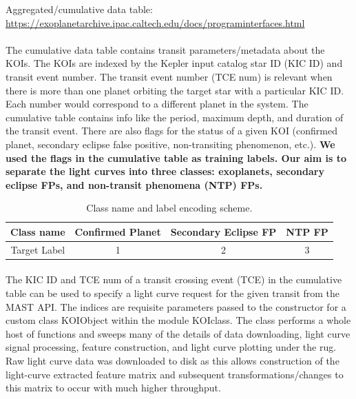 \documentclass{article}
\begin{document}
Aggregated/cumulative data table: \\ \href{https://exoplanetarchive.ipac.caltech.edu/docs/program_interfaces.html}{https://exoplanetarchive.ipac.caltech.edu/docs/program\textunderscore interfaces.html}

\paragraph{}
The cumulative data table contains transit parameters/metadata about the KOIs. The KOIs are indexed by the Kepler input catalog star ID (KIC ID) and transit event number. The transit event number (TCE num) is relevant when there is more than one planet orbiting the target star with a particular KIC ID. Each number would correspond to a different planet in the system. The cumulative table contains info like the period, maximum depth, and duration of the transit event. There are also flags for the status of a given KOI (confirmed planet, secondary eclipse false positive, non-transiting phenomenon, etc.). \textbf{We used the flags in the cumulative table as training labels. Our aim is to separate the light curves into three classes: exoplanets, secondary eclipse FPs, and non-transit phenomena (NTP) FPs.}  

\begin{table}[H]
	

\begin{tabular}{|c|c|c|c|}
	\hline
	Class name & Confirmed Planet  & Secondary Eclipse FP   &  NTP FP  \\
	\hline
	Target Label & 1  & 2 & 3    \\
	\hline

\end{tabular}
\caption{Class name and label encoding scheme.}
\end{table}

\paragraph{} 
The KIC ID and TCE num of a transit crossing event (TCE) in the cumulative table can be used to specify a light curve request for the given transit from the MAST API. The indices are requisite parameters passed to the constructor for a custom class KOIObject within the module KOIclass. The class performs a whole host of functions and sweeps many of the details of data downloading, light curve signal processing, feature construction, and light curve plotting under the rug. Raw light curve data was downloaded to disk as this allows construction of the light-curve extracted feature matrix and subsequent transformations/changes to this matrix to occur with much higher throughput. 
\end{document}
